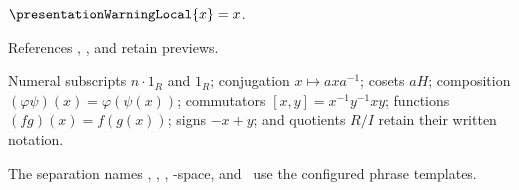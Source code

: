 

\begin{definition}\label{presentation_warning_local}
    $\presentationWarningLocal{x}=x$.
\end{definition}

References , ,
and  retain previews.

Numeral subscripts $n\cdot 1_R$ and $1_R$; conjugation $x\mapsto axa^{-1}$;
cosets $aH$; composition $(\varphi\psi)(x)=\varphi(\psi(x))$;
commutators \( [x,y]=x^{-1}y^{-1}xy \); functions \((fg)(x)=f(g(x))\);
signs $-x+y$; and quotients $R/I$ retain their written notation.

The separation names \teezero, \teeone, \teetwo, \teethree-space,
and \teefour\ use the configured phrase templates.
